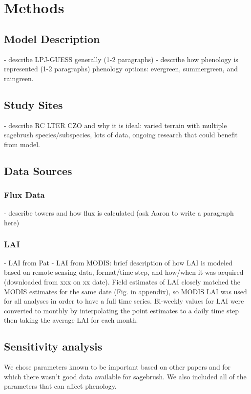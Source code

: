 \documentclass[]{article}
\title{}
\author{}
\begin{document}
\maketitle

\begin{abstract}

\end{abstract}

\section{Methods}
\subsection{Model Description}
- describe LPJ-GUESS generally (1-2 paragraphs)
- describe how phenology is represented (1-2 paragraphs)
 phenology options: evergreen, summergreen, and raingreen.
\subsection{Study Sites}
- describe RC LTER CZO and why it is ideal: varied terrain with multiple sagebrush species/subspecies, lots of data, ongoing research that could benefit from model.
\subsection{Data Sources}
\subsubsection{Flux Data}
- describe towers and how flux is calculated (ask Aaron to write a paragraph here)
\subsubsection{LAI}
- LAI from Pat
- LAI from MODIS: brief description of how LAI is modeled based on remote sensing data, format/time step, and how/when it was acquired (downloaded from xxx on xx date).
Field estimates of LAI closely matched the MODIS estimates for the same date (Fig. in appendix), so MODIS LAI was used for all analyses in order to have a full time series. Bi-weekly values for LAI were converted to monthly by interpolating the point estimates to a daily time step then taking the average LAI for each month.
\subsection{Sensitivity analysis}
We chose parameters known to be important based on other papers and for which there wasn't good data available for sagebrush. We also included all of the parameters that can affect phenology.
\end{document}

